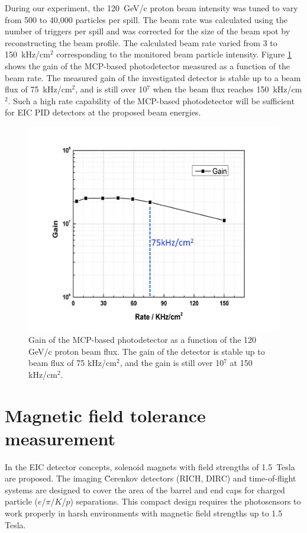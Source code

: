 \documentclass[preprint,5p]{elsarticle}
\begin{document}
During our experiment, the 120~GeV/c proton beam intensity was tuned to vary 
from 500 to 40,000 particles per spill. The beam rate was calculated using the 
number of triggers per spill and was corrected for the size of the beam spot by 
reconstructing the beam profile. The calculated beam rate varied from 3 to 
150~kHz/cm$^2$ corresponding to the monitored beam particle intensity. Figure 
\ref{fig:MCPs_gain_proton_beam} shows the gain of the MCP-based photodetector 
measured as a function of the beam rate. The measured gain of the investigated 
detector is stable up to a beam flux of 75~kHz/cm$^2$, and is still over 10$^7$ 
when the beam flux reaches 150~kHz/cm$^2$. Such a high rate capability of the 
MCP-based photodetector will be sufficient for EIC PID detectors at the 
proposed beam energies.

\begin{figure}[tbp]
\centering 
\includegraphics[scale=0.25]{fig/MCPs_gain_proton_beam.png}
\caption{Gain of the MCP-based photodetector as a function of the 120 GeV/c 
proton beam flux. The gain of the detector is stable up to beam flux of 75 
kHz/cm$^2$, and the gain is still over 10$^7$ at 150 kHz/cm$^2$. } 
\label{fig:MCPs_gain_proton_beam}
\end{figure}

\section{Magnetic field tolerance measurement}\label{sec_B_measurement}
In the EIC detector concepts, solenoid magnets with field strengths of 
1.5~Tesla are proposed. The imaging \u Cerenkov detectors (RICH, DIRC) and 
time-of-flight systems are designed to cover the area of the barrel and end 
caps for charged particle ($e$/$\pi$/$K$/$p$) separations. This compact design 
requires the photosensors to work properly in harsh environments with magnetic 
field strengths up to 1.5 Tesla. 
\end{document}
